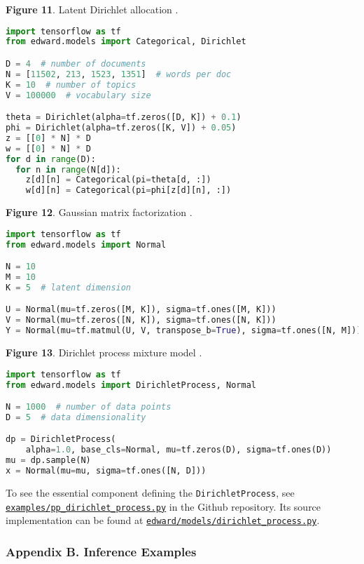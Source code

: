 \textbf{Figure 11}. Latent Dirichlet allocation \citep{blei2003latent}.
\begin{lstlisting}[language=python]
import tensorflow as tf
from edward.models import Categorical, Dirichlet

D = 4  # number of documents
N = [11502, 213, 1523, 1351]  # words per doc
K = 10  # number of topics
V = 100000  # vocabulary size

theta = Dirichlet(alpha=tf.zeros([D, K]) + 0.1)
phi = Dirichlet(alpha=tf.zeros([K, V]) + 0.05)
z = [[0] * N] * D
w = [[0] * N] * D
for d in range(D):
  for n in range(N[d]):
    z[d][n] = Categorical(pi=theta[d, :])
    w[d][n] = Categorical(pi=phi[z[d][n], :])
\end{lstlisting}

\textbf{Figure 12}. Gaussian matrix factorization
\citep{salakhutdinov2011probabilistic}.
\begin{lstlisting}[language=python]
import tensorflow as tf
from edward.models import Normal

N = 10
M = 10
K = 5  # latent dimension

U = Normal(mu=tf.zeros([M, K]), sigma=tf.ones([M, K]))
V = Normal(mu=tf.zeros([N, K]), sigma=tf.ones([N, K]))
Y = Normal(mu=tf.matmul(U, V, transpose_b=True), sigma=tf.ones([N, M]))
\end{lstlisting}

\textbf{Figure 13}. Dirichlet process mixture model \citep{antoniak1974mixtures}.
\begin{lstlisting}[language=python]
import tensorflow as tf
from edward.models import DirichletProcess, Normal

N = 1000  # number of data points
D = 5  # data dimensionality

dp = DirichletProcess(
    alpha=1.0, base_cls=Normal, mu=tf.zeros(D), sigma=tf.ones(D))
mu = dp.sample(N)
x = Normal(mu=mu, sigma=tf.ones([N, D]))
\end{lstlisting}
To see the essential component defining the \texttt{DirichletProcess}, see
\href{https://github.com/blei-lab/edward/blob/master/examples/pp_dirichlet_process.py}{\texttt{examples/pp_dirichlet_process.py}}
in the Github repository. Its source implementation can be found at
\href{https://github.com/blei-lab/edward/blob/master/edward/models/dirichlet_process.py}{\texttt{edward/models/dirichlet_process.py}}.

\subsubsection{Appendix B. Inference Examples}

